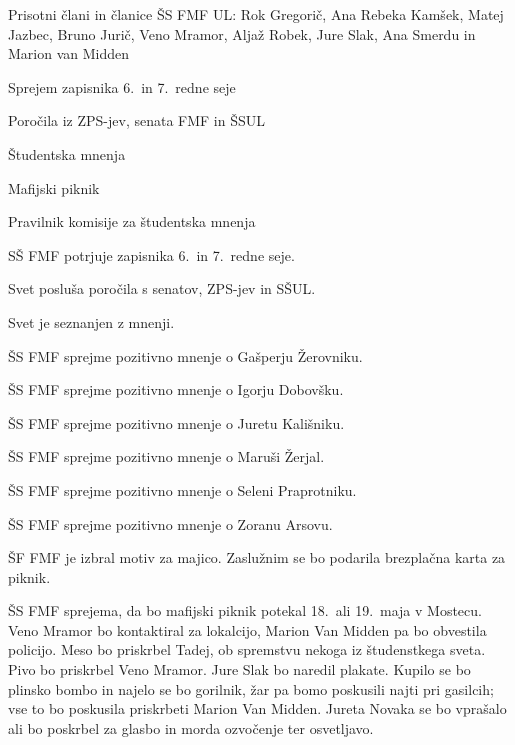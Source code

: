 \documentclass{seja}
\begin{document}
Prisotni člani in članice ŠS FMF UL: Rok Gregorič,  Ana Rebeka Kamšek, Matej Jazbec, Bruno Jurič,
Veno Mramor, Aljaž Robek, Jure Slak, Ana Smerdu in Marion van Midden

\begin{red*}
\item Sprejem zapisnika 6.~in 7.~redne seje
\item Poročila iz ZPS-jev, senata FMF in ŠSUL
\item Študentska mnenja
\item Mafijski piknik
\item Pravilnik komisije za študentska mnenja
\end{red*}

\begin{ad}
\item
\begin{sklep*}
SŠ FMF potrjuje zapisnika 6.~in 7.~redne seje.
\end{sklep*}

\item Svet posluša poročila s senatov, ZPS-jev in SŠUL.

\item Svet je seznanjen z mnenji.
\begin{sklep*}
ŠS FMF sprejme pozitivno mnenje o Gašperju Žerovniku.
\end{sklep*}
\begin{sklep*}
ŠS FMF sprejme pozitivno mnenje o Igorju Dobovšku.
\end{sklep*}
\begin{sklep*}
ŠS FMF sprejme pozitivno mnenje o Juretu Kališniku.
\end{sklep*}
\begin{sklep*}
ŠS FMF sprejme pozitivno mnenje o Maruši Žerjal.
\end{sklep*}
\begin{sklep*}
ŠS FMF sprejme pozitivno mnenje o Seleni Praprotniku.
\end{sklep*}
\begin{sklep*}
ŠS FMF sprejme pozitivno mnenje o Zoranu Arsovu.
\end{sklep*}

\item
\begin{sklep*}
ŠF FMF je izbral motiv za majico. Zaslužnim se bo podarila brezplačna karta za piknik.
\end{sklep*}

\begin{sklep*}
ŠS FMF sprejema, da bo mafijski piknik potekal 18.~ali 19.~maja v Mostecu. Veno Mramor bo kontaktiral za lokalcijo, Marion Van Midden pa bo obvestila policijo. Meso bo priskrbel Tadej, ob spremstvu nekoga iz študenstkega sveta. Pivo bo priskrbel Veno Mramor. Jure Slak bo naredil plakate. Kupilo se bo plinsko bombo in najelo se bo gorilnik, žar pa bomo poskusili najti pri gasilcih; vse to bo poskusila priskrbeti Marion Van Midden. Jureta Novaka se bo vprašalo ali bo poskrbel za glasbo in morda ozvočenje ter osvetljavo.
\end{sklep*}


\end{ad}
\end{document}
